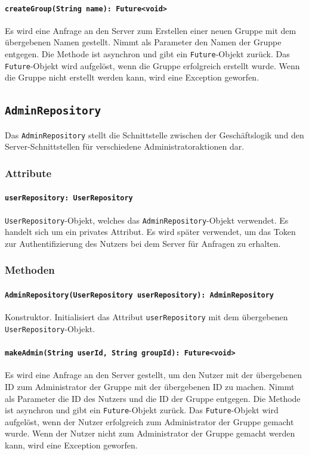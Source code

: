 \documentclass{entwurfsheft}
\begin{document}
\paragraph{\texttt{createGroup(String name): Future<void>}}
Es wird eine Anfrage an den Server zum Erstellen einer neuen Gruppe mit dem übergebenen Namen gestellt. Nimmt als Parameter den Namen der Gruppe entgegen. Die Methode ist asynchron und gibt ein \texttt{Future}-Objekt zurück. Das \texttt{Future}-Objekt wird aufgelöst, wenn die Gruppe erfolgreich erstellt wurde. Wenn die Gruppe nicht erstellt werden kann, wird eine Exception geworfen.

\newpage
\subsection{\texttt{AdminRepository}}\label{sec:adminrepository}
Das \texttt{AdminRepository} stellt die Schnittstelle zwischen der Geschäftslogik und den Server-Schnittstellen für verschiedene Administratoraktionen dar.
\subsubsection*{Attribute}
\paragraph{\texttt{userRepository: UserRepository}}
\texttt{UserRepository}-Objekt, welches das \texttt{AdminRepository}-Objekt verwendet. Es handelt sich um ein privates Attribut. Es wird später verwendet, um das Token zur Authentifizierung des Nutzers bei dem Server für Anfragen zu erhalten.
\subsubsection*{Methoden}
\paragraph{\texttt{AdminRepository(UserRepository userRepository): AdminRepository}}
Konstruktor. Initialisiert das Attribut \texttt{userRepository} mit dem übergebenen \texttt{UserRepository}-Objekt.
\paragraph{\texttt{makeAdmin(String userId, String groupId): Future<void>}}
Es wird eine Anfrage an den Server gestellt, um den Nutzer mit der übergebenen ID zum Administrator der Gruppe mit der übergebenen ID zu machen. Nimmt als Parameter die ID des Nutzers und die ID der Gruppe entgegen. Die Methode ist asynchron und gibt ein \texttt{Future}-Objekt zurück. Das \texttt{Future}-Objekt wird aufgelöst, wenn der Nutzer erfolgreich zum Administrator der Gruppe gemacht wurde. Wenn der Nutzer nicht zum Administrator der Gruppe gemacht werden kann, wird eine Exception geworfen.
\end{document}
